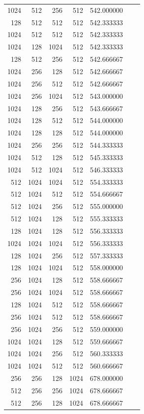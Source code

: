 \documentclass{article}
\begin{document}
{\begin{longtable}{rrrrrrr}
1024 & 512 & 256 & 512 & 542.000000 \\
128 & 512 & 512 & 512 & 542.333333 \\
1024 & 512 & 512 & 512 & 542.333333 \\
1024 & 128 & 1024 & 512 & 542.333333 \\
128 & 512 & 256 & 512 & 542.666667 \\
1024 & 256 & 128 & 512 & 542.666667 \\
1024 & 256 & 512 & 512 & 542.666667 \\
1024 & 256 & 1024 & 512 & 543.000000 \\
1024 & 128 & 256 & 512 & 543.666667 \\
1024 & 128 & 512 & 512 & 544.000000 \\
1024 & 128 & 128 & 512 & 544.000000 \\
1024 & 256 & 256 & 512 & 544.333333 \\
1024 & 512 & 128 & 512 & 545.333333 \\
1024 & 512 & 1024 & 512 & 546.333333 \\
512 & 1024 & 1024 & 512 & 554.333333 \\
512 & 1024 & 512 & 512 & 554.666667 \\
512 & 1024 & 256 & 512 & 555.000000 \\
512 & 1024 & 128 & 512 & 555.333333 \\
128 & 1024 & 128 & 512 & 556.333333 \\
1024 & 1024 & 1024 & 512 & 556.333333 \\
128 & 1024 & 256 & 512 & 557.333333 \\
128 & 1024 & 1024 & 512 & 558.000000 \\
256 & 1024 & 128 & 512 & 558.666667 \\
256 & 1024 & 1024 & 512 & 558.666667 \\
128 & 1024 & 512 & 512 & 558.666667 \\
256 & 1024 & 512 & 512 & 558.666667 \\
256 & 1024 & 256 & 512 & 559.000000 \\
1024 & 1024 & 128 & 512 & 559.666667 \\
1024 & 1024 & 256 & 512 & 560.333333 \\
1024 & 1024 & 512 & 512 & 560.666667 \\
256 & 256 & 128 & 1024 & 678.000000 \\
512 & 256 & 256 & 1024 & 678.666667 \\
512 & 256 & 128 & 1024 & 678.666667 \\

\end{longtable}}
\end{document}
